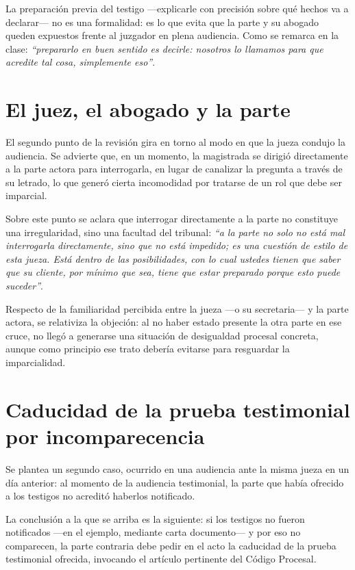 \documentclass[12pt,oneside]{book}
\begin{document}
\begin{important}
La preparación previa del testigo ---explicarle con precisión sobre qué hechos va a declarar--- no es una formalidad: es lo que evita que la parte y su abogado queden expuestos frente al juzgador en plena audiencia. Como se remarca en la clase: \textit{``prepararlo en buen sentido es decirle: nosotros lo llamamos para que acredite tal cosa, simplemente eso''}.
\end{important}

\section{El juez, el abogado y la parte}

El segundo punto de la revisión gira en torno al modo en que la jueza condujo la audiencia. Se advierte que, en un momento, la magistrada se dirigió directamente a la parte actora para interrogarla, en lugar de canalizar la pregunta a través de su letrado, lo que generó cierta incomodidad por tratarse de un rol que debe ser imparcial.

Sobre este punto se aclara que interrogar directamente a la parte no constituye una irregularidad, sino una facultad del tribunal: \textit{``a la parte no solo no está mal interrogarla directamente, sino que no está impedido; es una cuestión de estilo de esta jueza. Está dentro de las posibilidades, con lo cual ustedes tienen que saber que su cliente, por mínimo que sea, tiene que estar preparado porque esto puede suceder''}.

Respecto de la familiaridad percibida entre la jueza ---o su secretaria--- y la parte actora, se relativiza la objeción: al no haber estado presente la otra parte en ese cruce, no llegó a generarse una situación de desigualdad procesal concreta, aunque como principio ese trato debería evitarse para resguardar la imparcialidad.

\section{Caducidad de la prueba testimonial por incomparecencia}

Se plantea un segundo caso, ocurrido en una audiencia ante la misma jueza en un día anterior: al momento de la audiencia testimonial, la parte que había ofrecido a los testigos no acreditó haberlos notificado.

La conclusión a la que se arriba es la siguiente: si los testigos no fueron notificados ---en el ejemplo, mediante carta documento--- y por eso no comparecen, la parte contraria debe pedir en el acto la caducidad de la prueba testimonial ofrecida, invocando el artículo pertinente del Código Procesal.
\end{document}
